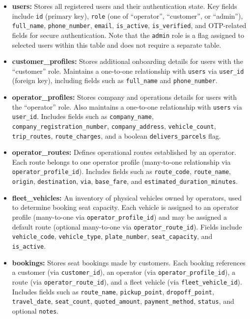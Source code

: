 \begin{itemize}
    \item \textbf{users:} Stores all registered users and their authentication
    state. Key fields include \texttt{id} (primary key), \texttt{role} (one of
    ``operator'', ``customer'', or ``admin''), \texttt{full\_name},
    \texttt{phone\_number}, \texttt{email}, \texttt{is\_active},
    \texttt{is\_verified}, and OTP-related fields for secure authentication.
    Note that the \texttt{admin} role is a flag assigned to selected users
    within this table and does not require a separate table.

    \item \textbf{customer\_profiles:} Stores additional onboarding details for
    users with the ``customer'' role. Maintains a one-to-one relationship with
    \texttt{users} via \texttt{user\_id} (foreign key), including fields such
    as \texttt{full\_name} and \texttt{phone\_number}.

    \item \textbf{operator\_profiles:} Stores company and operations details for
    users with the ``operator'' role. Also maintains a one-to-one relationship
    with \texttt{users} via \texttt{user\_id}. Includes fields such as
    \texttt{company\_name}, \texttt{company\_registration\_number},
    \texttt{company\_address}, \texttt{vehicle\_count}, \texttt{trip\_routes},
    \texttt{route\_charges}, and a boolean \texttt{delivers\_parcels} flag.

    \item \textbf{operator\_routes:} Defines operational routes established by
    an operator. Each route belongs to one operator profile (many-to-one
    relationship via \texttt{operator\_profile\_id}). Includes fields such as
    \texttt{route\_code}, \texttt{route\_name}, \texttt{origin},
    \texttt{destination}, \texttt{via}, \texttt{base\_fare}, and
    \texttt{estimated\_duration\_minutes}.

    \item \textbf{fleet\_vehicles:} An inventory of physical vehicles owned by
    operators, used to determine booking seat capacity. Each vehicle is assigned
    to an operator profile (many-to-one via \texttt{operator\_profile\_id}) and
    may be assigned a default route (optional many-to-one via
    \texttt{operator\_route\_id}). Fields include \texttt{vehicle\_code},
    \texttt{vehicle\_type}, \texttt{plate\_number}, \texttt{seat\_capacity},
    and \texttt{is\_active}.

    \item \textbf{bookings:} Stores seat bookings made by customers. Each booking
    references a customer (via \texttt{customer\_id}), an operator (via
    \texttt{operator\_profile\_id}), a route (via \texttt{operator\_route\_id}),
    and a fleet vehicle (via \texttt{fleet\_vehicle\_id}). Includes fields such
    as \texttt{route\_name}, \texttt{pickup\_point}, \texttt{dropoff\_point},
    \texttt{travel\_date}, \texttt{seat\_count}, \texttt{quoted\_amount},
    \texttt{payment\_method}, \texttt{status}, and optional \texttt{notes}.


\end{itemize}
